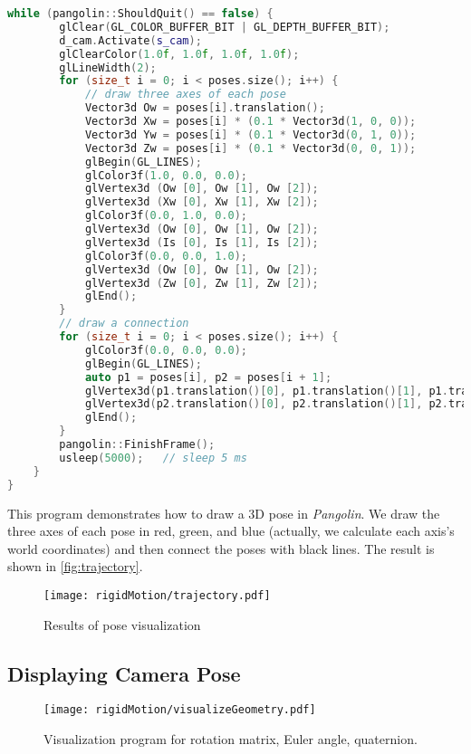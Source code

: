 \begin{lstlisting}[language=c++,caption=slambook2/ch3/examples/plotTrajectory.cpp]
	while (pangolin::ShouldQuit() == false) {
		glClear(GL_COLOR_BUFFER_BIT | GL_DEPTH_BUFFER_BIT);
		d_cam.Activate(s_cam);
		glClearColor(1.0f, 1.0f, 1.0f, 1.0f);
		glLineWidth(2);
		for (size_t i = 0; i < poses.size(); i++) {
			// draw three axes of each pose
			Vector3d Ow = poses[i].translation();
			Vector3d Xw = poses[i] * (0.1 * Vector3d(1, 0, 0));
			Vector3d Yw = poses[i] * (0.1 * Vector3d(0, 1, 0));
			Vector3d Zw = poses[i] * (0.1 * Vector3d(0, 0, 1));
			glBegin(GL_LINES);
			glColor3f(1.0, 0.0, 0.0);
			glVertex3d (Ow [0], Ow [1], Ow [2]);
			glVertex3d (Xw [0], Xw [1], Xw [2]);
			glColor3f(0.0, 1.0, 0.0);
			glVertex3d (Ow [0], Ow [1], Ow [2]);
			glVertex3d (Is [0], Is [1], Is [2]);
			glColor3f(0.0, 0.0, 1.0);
			glVertex3d (Ow [0], Ow [1], Ow [2]);
			glVertex3d (Zw [0], Zw [1], Zw [2]);
			glEnd();
		}
		// draw a connection
		for (size_t i = 0; i < poses.size(); i++) {
			glColor3f(0.0, 0.0, 0.0);
			glBegin(GL_LINES);
			auto p1 = poses[i], p2 = poses[i + 1];
			glVertex3d(p1.translation()[0], p1.translation()[1], p1.translation()[2]);
			glVertex3d(p2.translation()[0], p2.translation()[1], p2.translation()[2]);
			glEnd();
		}
		pangolin::FinishFrame();
		usleep(5000);   // sleep 5 ms
	}
}
\end{lstlisting}

This program demonstrates how to draw a 3D pose in \textit{Pangolin}. We draw the three axes of each pose in red, green, and blue (actually, we calculate each axis's world coordinates) and then connect the poses with black lines. The result is shown in \autoref {fig:trajectory}.

\begin{figure}[!htp]
	\centering
	\texttt{[image: rigidMotion/trajectory.pdf]}
	\caption {Results of pose visualization}
	\label{fig:trajectory}
\end{figure}

\subsection{Displaying Camera Pose}
\begin{figure}[!htp]
	\centering
	\texttt{[image: rigidMotion/visualizeGeometry.pdf]}
	\caption {Visualization program for rotation matrix, Euler angle, quaternion. }
	\label{fig:visualizeGeometry}
\end{figure}

